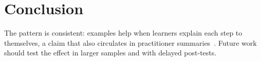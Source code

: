 \documentclass[a4paper,12pt]{article}
\begin{document}
  \section{Conclusion}
  The pattern is consistent: examples help when learners explain each step
  to themselves, a claim that also circulates in practitioner
  summaries~\cite{example3}. Future work should test the effect in larger
  samples and with delayed post-tests.

  
  
\end{document}

